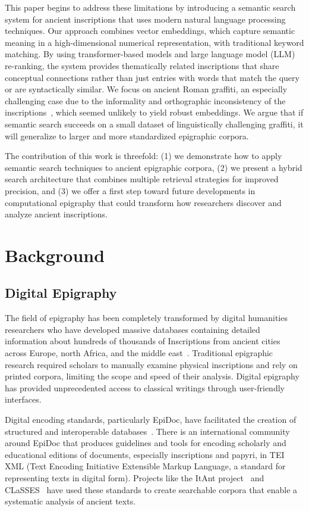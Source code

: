 \documentclass[final,greek,american]{anthology-ch}
\begin{document}
This paper begins to address these limitations by introducing a semantic search system for ancient inscriptions that uses modern natural language processing techniques. Our approach combines vector embeddings, which capture semantic meaning in a high-dimensional numerical representation, with traditional keyword matching. By using transformer-based models and large language model (LLM) re-ranking, the system provides thematically related inscriptions that share conceptual connections rather than just entries with words that match the query or are syntactically similar. We focus on ancient Roman graffiti, an especially challenging case due to the informality and orthographic inconsistency of the inscriptions~\cite{benefiel_documenting_2023}, which seemed unlikely to yield robust embeddings. We argue that if semantic search succeeds on a small dataset of linguistically challenging graffiti, it will generalize to larger and more standardized epigraphic corpora.

The contribution of this work is threefold: (1) we demonstrate how to apply semantic search techniques to ancient epigraphic corpora, (2) we present a hybrid search architecture that combines multiple retrieval strategies for improved precision, and (3) we offer a first step toward future developments in computational epigraphy that could transform how researchers discover and analyze ancient inscriptions.

\section{Background}
\subsection{Digital Epigraphy}

The field of epigraphy has been completely transformed by digital humanities researchers who have developed massive databases containing detailed information about hundreds of thousands of Inscriptions from ancient cities across Europe, north Africa, and the middle east~\cite{cayless_epigraphy_2009, elliott_2014_epigraphy, hermankova_2021_inscriptions}. Traditional epigraphic research required scholars to manually examine physical inscriptions and rely on printed corpora, limiting the scope and speed of their analysis. Digital epigraphy has provided unprecedented access to classical writings through user-friendly interfaces.

Digital encoding standards, particularly EpiDoc, have facilitated the creation of structured and interoperable databases~\cite{elliot_epidoc_2006}.
There is an international community around EpiDoc that produces guidelines and tools for encoding scholarly and educational editions of documents, especially inscriptions and papyri, in TEI XML (Text Encoding Initiative Extensible Markup Language, a standard for representing texts in digital form). Projects like the ItAnt project~\cite{murano_describing_2023} and CLaSSES~\cite{de_felice_classes_2015} have used these standards to create searchable corpora that enable a systematic analysis of ancient texts.
\end{document}
